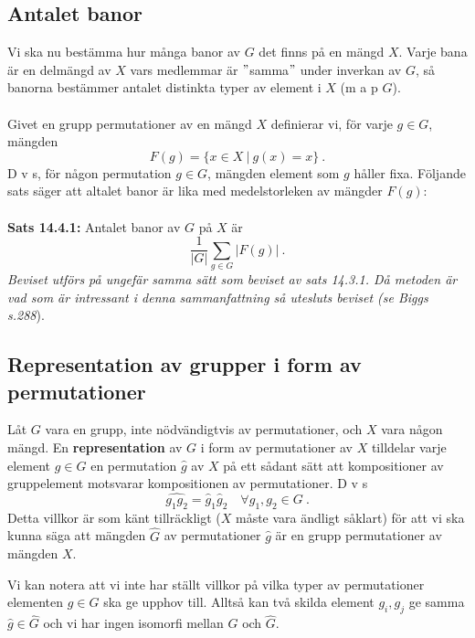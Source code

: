 \documentclass{article}
\begin{document}
\subsection{Antalet banor}
Vi ska nu bestämma hur många banor av $G$ det finns på en mängd $X$. Varje bana är en delmängd av $X$ vars medlemmar är $"$samma$"$ under inverkan av $G$, så banorna bestämmer antalet distinkta typer av element i $X$ (m a p $G$).
\\ \\
Givet en grupp permutationer av en mängd $X$ definierar vi, för varje $g\in G$, mängden
$$
F(g)=\{x\in X \ | \ g(x)=x\} \ .
$$
D v s, för någon permutation $g\in G$, mängden element som $g$ håller fixa. Följande sats säger att altalet banor är lika med medelstorleken av mängder $F(g)$:
\\ \\
\textbf{Sats 14.4.1:} Antalet banor av $G$ på $X$ är
$$
\frac{1}{|G|}\sum_{g\in G}|F(g)| \ .
$$
\textit{Beviset utförs på ungefär samma sätt som beviset av sats 14.3.1. Då metoden är vad som är intressant i denna sammanfattning så utesluts beviset (se Biggs s.288}).


\subsection{Representation av grupper i form av permutationer}
Låt $G$ vara en grupp, inte nödvändigtvis av permutationer, och $X$ vara någon mängd. En \textbf{representation} av $G$ i form av permutationer av $X$ tilldelar varje element $g\in G$ en permutation $\hat{g}$ av $X$ på ett sådant sätt att kompositioner av gruppelement motsvarar kompositionen av permutationer. D v s 
$$
\widehat{g_1g_2}=\hat{g}_1\hat{g}_2 \quad \forall g_1,g_2\in G \ .
$$
Detta villkor är som känt tillräckligt ($X$ måste vara ändligt såklart) för att vi ska kunna säga att mängden $\hat{G}$ av permutationer $\hat{g}$ är en grupp permutationer av mängden $X$.

Vi kan notera att vi inte har ställt villkor på vilka typer av permutationer elementen $g\in G$ ska ge upphov till. Alltså kan två skilda element $g_i,g_j$ ge samma $\hat{g}\in\hat{G}$ och vi har ingen isomorfi mellan $G$ och $\hat{G}$.
\end{document}
